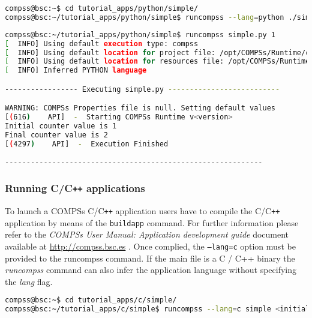 \begin{lstlisting}[language=bash]
compss@bsc:~$ cd tutorial_apps/python/simple/
compss@bsc:~/tutorial_apps/python/simple$ runcompss --lang=python ./simple.py <initial_number>
\end{lstlisting}

\begin{lstlisting}[language=bash]
compss@bsc:~/tutorial_apps/python/simple$ runcompss simple.py 1
[  INFO] Using default execution type: compss
[  INFO] Using default location for project file: /opt/COMPSs/Runtime/configuration/xml/projects/default_project.xml
[  INFO] Using default location for resources file: /opt/COMPSs/Runtime/configuration/xml/resources/default_resources.xml
[  INFO] Inferred PYTHON language

----------------- Executing simple.py --------------------------

WARNING: COMPSs Properties file is null. Setting default values
[(616)    API]  -  Starting COMPSs Runtime v<version>
Initial counter value is 1
Final counter value is 2
[(4297)    API]  -  Execution Finished

------------------------------------------------------------
\end{lstlisting}


\subsubsection{Running C/C\texttt{++} applications}
To launch a COMPSs C/C\texttt{++} application users have to compile the C/C\texttt{++} application by means of the \texttt{buildapp} command.
For further information please refer to the \textit{COMPSs User Manual: Application development guide} document available at
\url{http://compss.bsc.es} . Once complied, the \texttt{--lang=c} option must be provided to the runcompss command. If the main file is 
a C / C++ binary the \textit{runcompss} command can also infer the application language without specifying the \textit{lang} flag. 

\begin{lstlisting}[language=bash]
compss@bsc:~$ cd tutorial_apps/c/simple/
compss@bsc:~/tutorial_apps/c/simple$ runcompss --lang=c simple <initial_number>
\end{lstlisting}

